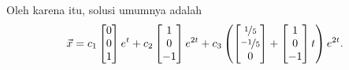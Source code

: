 \begin{example}
Oleh karena itu, solusi umumnya adalah
\begin{equation*}
\vec{x} =
c_1
\begin{bmatrix} 0 \\ 0 \\ 1 \end{bmatrix}
e^t
+
c_2 
\begin{bmatrix} 1 \\ 0 \\ -1 \end{bmatrix}
e^{2t}
+
c_3
\left(
\begin{bmatrix} \nicefrac{1}{5} \\ \nicefrac{-1}{5} \\ 0 \end{bmatrix}
+
\begin{bmatrix} 1 \\ 0 \\ -1 \end{bmatrix}
t
\right)
e^{2t}
.
\end{equation*}
\end{example}

